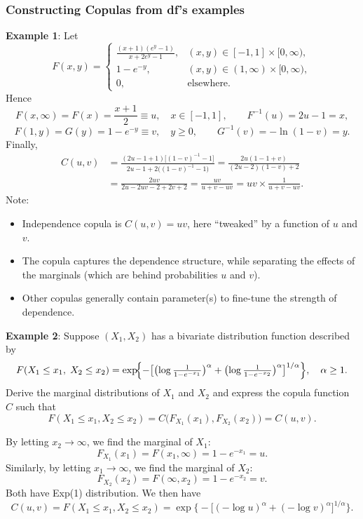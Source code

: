 \documentclass[11pt]{article}
\newcommand{\noi}{\noindent}
\begin{document}
\subsubsection{Constructing Copulas from df's examples}
\noi \textbf{Example 1}:
\noi Let
\[
F(x,y)=
\begin{cases}
\displaystyle \frac{(x+1)(e^y-1)}{x+2e^y-1}, & (x,y)\in[-1,1]\times[0,\infty),\\[0.5em]
1-e^{-y}, & (x,y)\in(1,\infty)\times[0,\infty),\\[0.5em]
0, & \text{elsewhere}.
\end{cases}
\]
\noi Hence
\[
F(x,\infty)=F(x)=\frac{x+1}{2}\equiv u,\quad x\in[-1,1],
\qquad
F^{-1}(u)=2u-1=x,
\]
\[
F(1,y)=G(y)=1-e^{-y}\equiv v,\quad y\ge0,
\qquad
G^{-1}(v)=-\ln(1-v)=y.
\]
\noi Finally,
\begin{align*}
C(u,v)
&=\frac{(2u-1+1)\bigl[(1-v)^{-1}-1\bigr]}{2u-1+2\bigl((1-v)^{-1}-1\bigr)}
=\frac{2u(1-1+v)}{(2u-2)(1-v)+2}\\
&=\frac{2uv}{2u-2uv-2+2v+2}
=\frac{uv}{u+v-uv}
=uv\times\frac{1}{u+v-uv}.
\end{align*}
\noi Note:
\begin{itemize}
    \item Independence copula is $C(u,v)=uv$, here “tweaked” by a function of $u$ and $v$.
    \item The copula captures the dependence structure, while separating the effects of the marginals (which are behind probabilities $u$ and $v$).
    \item Other copulas generally contain parameter(s) to fine-tune the strength of dependence.
\end{itemize} \phantom{i}

\noi \textbf{Example 2}:
\noi Suppose $(X_1,X_2)$ has a bivariate distribution function described by
\[
F(X_1\le x_1,\;X_2\le x_2)
=\exp\!\Bigl\{-\bigl[\bigl(\log\tfrac{1}{1-e^{-x_1}}\bigr)^\alpha
+\bigl(\log\tfrac{1}{1-e^{-x_2}}\bigr)^\alpha\bigr]^{1/\alpha}\Bigr\},
\quad \alpha\ge1.
\]
Derive the marginal distributions of $X_1$ and $X_2$ and express the copula function $C$ such that
\[
F(X_1\le x_1,X_2\le x_2)
=C\bigl(F_{X_1}(x_1),F_{X_2}(x_2)\bigr)
=C(u,v).
\]

\noi By letting $x_2\to\infty$, we find the marginal of $X_1$:
\[
F_{X_1}(x_1)=F(x_1,\infty)=1-e^{-x_1}=u.
\]
Similarly, by letting $x_1\to\infty$, we find the marginal of $X_2$:
\[
F_{X_2}(x_2)=F(\infty,x_2)=1-e^{-x_2}=v.
\]
Both have Exp(1) distribution. We then have
\[
C(u,v)
=F(X_1\le x_1,X_2\le x_2)
=\exp\!\bigl\{-\bigl[(-\log u)^\alpha+(-\log v)^\alpha\bigr]^{1/\alpha}\bigr\}.
\]
\end{document}
